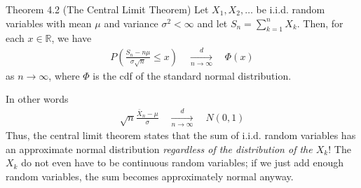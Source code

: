\begin{boks}{Theorem 4.2 (The Central Limit Theorem)}
  Let $X_1, X_2, \ldots$ be i.i.d. random variables with mean $\mu$ and variance $\sigma^2 < \infty$ and let $S_n = \sum_{k = 1}^{n} X_k$. Then, for each $x \in \mathbb{R}$, we have
  \begin{align*}
    P\left(\frac{S_n - n\mu}{\sigma \sqrt{n}} \leq x \right) \quad \xrightarrow[n \rightarrow \infty]{d} \quad \Phi(x)
  \end{align*}
  as $n \rightarrow \infty$, where $\Phi$ is the cdf of the standard normal distribution.
\end{boks}
In other words
\begin{align*}
  \sqrt{n}\frac{\bar{X}_n - \mu}{\sigma} \quad \xrightarrow[n \rightarrow \infty]{d} \quad N(0,1)
\end{align*}
Thus, the central limit theorem states that the sum of i.i.d. random variables has an approximate normal distribution \textit{regardless of the distribution of the $X_k$}!
The $X_k$ do not even have to be continuous random variables; if we just add enough random variables, the sum becomes approximately normal anyway.

